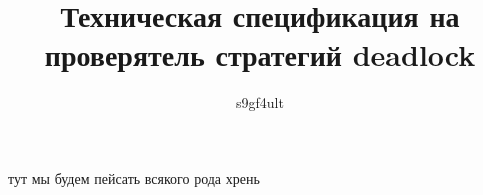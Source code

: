 \documentclass[a4paper,14pt]{article}
\author{s9gf4ult}
\title{Техническая спецификация на проверятель стратегий deadlock}
\begin{document}
\maketitle
\tableofcontents
{}
тут мы будем пейсать всякого рода хрень
\end{document}
